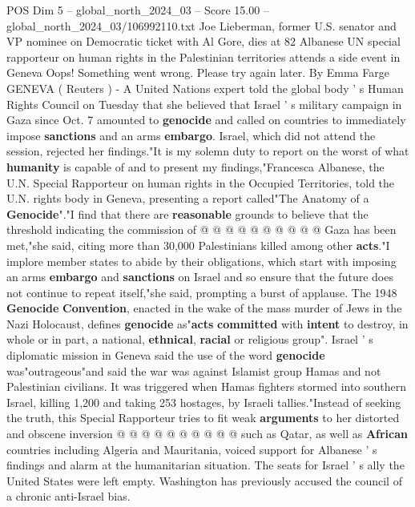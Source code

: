 \begin{textsample}{POS Dim 5 – global\_north\_2024\_03 – Score 15.00 – global\_north\_2024\_03/106992110.txt}  \label{ex:f5_pos_365}
Joe Lieberman, former U.S. senator and VP nominee on Democratic ticket with Al Gore, dies at 82 Albanese UN special rapporteur on human rights in the Palestinian territories attends a side event in Geneva Oops!
Something went wrong.
Please try again later.
By Emma Farge GENEVA ( Reuters ) - A United Nations expert told the global body ' s Human Rights Council on Tuesday that she believed that Israel ' s military campaign in Gaza since Oct. 7 amounted to \textbf{genocide} and called on countries to immediately impose \textbf{sanctions} and an arms \textbf{embargo}.
Israel, which did not attend the session, rejected her findings."It is my solemn duty to report on the worst of what \textbf{humanity} is capable of and to present my findings,"Francesca Albanese, the U.N.
Special Rapporteur on human rights in the Occupied Territories, told the U.N. rights body in Geneva, presenting a report called"The Anatomy of a \textbf{Genocide}"."I find that there are \textbf{reasonable} grounds to believe that the threshold indicating the commission of @ @ @ @ @ @ @ @ @ @ Gaza has been met,"she said, citing more than 30,000 Palestinians killed among other \textbf{acts}."I implore member states to abide by their obligations, which start with imposing an arms \textbf{embargo} and \textbf{sanctions} on Israel and so ensure that the future does not continue to repeat itself,"she said, prompting a burst of applause.
The 1948 \textbf{Genocide} \textbf{Convention}, enacted in the wake of the mass murder of Jews in the Nazi Holocaust, defines \textbf{genocide} as"\textbf{acts} \textbf{committed} with \textbf{intent} to destroy, in whole or in part, a national, \textbf{ethnical}, \textbf{racial} or religious group".
Israel ' s diplomatic mission in Geneva said the use of the word \textbf{genocide} was"outrageous"and said the war was against Islamist group Hamas and not Palestinian civilians.
It was triggered when Hamas fighters stormed into southern Israel, killing 1,200 and taking 253 hostages, by Israeli tallies."Instead of seeking the truth, this Special Rapporteur tries to fit weak \textbf{arguments} to her distorted and obscene inversion @ @ @ @ @ @ @ @ @ @ such as Qatar, as well as \textbf{African} countries including Algeria and Mauritania, voiced support for Albanese ' s findings and alarm at the humanitarian situation.
The seats for Israel ' s ally the United States were left empty.
Washington has previously accused the council of a chronic anti-Israel bias.

\end{textsample}
